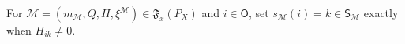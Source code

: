 For \(\mathcal M=(m_{\mathcal M},Q,H,\xi^{\mathcal M})\in\mathfrak F_x(P_X)\) and \(i\in\mathsf O\), set \(s_{\mathcal M}(i)=k\in\mathsf S_{\mathcal M}\) exactly when \(H_{ik}\ne0\).